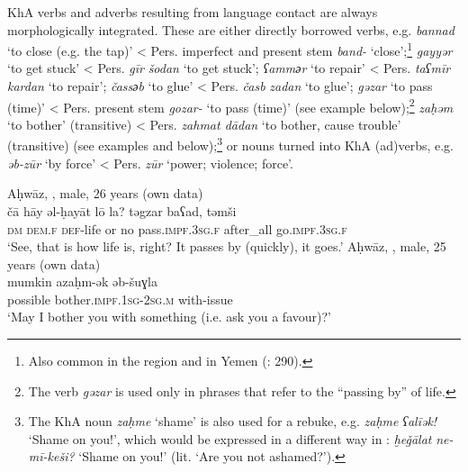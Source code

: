 \documentclass[output=paper,nonflat]{langsci/langscibook}
\begin{document}
KhA verbs and adverbs resulting from language contact are always morphologically integrated. These are either directly borrowed  verbs, e.g. \textit{bannad} ‘to close (e.g. the tap)’ < Pers. imperfect and present {stem} \textit{band-} ‘close’;\footnote{Also common in the  region and in {Yemen} (\citealt{BehnstedtWoidich2014}: 290).} \textit{gayyər} ‘to get stuck’ <  Pers. \textit{gīr} \textit{šodan} ‘to get stuck’; \textit{ʕamm{әr}} ‘to repair’ < Pers. \textit{taʕmīr} \textit{kardan} ‘to repair’; \textit{čass{әb}} ‘to glue’ < Pers. \textit{časb} \textit{zadan} ‘to glue’; \textit{gəzar} ‘to pass (time)’ < Pers. present {stem} \textit{gozar-} ‘to pass (time)’ (see example  below);\footnote{The verb \textit{gəzar} is used only in phrases that refer to the “passing by” of life.} \textit{zaḥəm} ‘to bother’ (transitive) < Pers. \textit{zahmat dādan} ‘to bother, cause trouble’ (transitive) (see examples  and  below);\footnote{The KhA noun \textit{zaḥme} `shame' is also used for a rebuke, e.g. \textit{zaḥme} \textit{ʕalīək!} ‘Shame on you!’, which would be expressed in a different way in : \textit{ḫeǧālat} \textit{ne-mī-keši?} ‘Shame on you!' (lit. ‘Are you not ashamed?’).} or  nouns turned into KhA (ad)verbs, e.g. \textit{əb-zūr} ‘by force’ < Pers. \textit{zūr} ‘power; violence; force’.

\ea
{Aḥwāz, , male, 26 years (own data)}\\ \label{ca}
\gll čā hāy əl-ḥayāt lō la? təgzar baʕad, təmši\\
     \textsc{dm} \textsc{dem}.\textsc{f} \textsc{def}{}-life or no pass.\textsc{impf}.\textsc{3sg.f} after\_all go.\textsc{impf.3sg.f}\\
\glt ‘See, that is how life is, right? It passes by (quickly), it goes.’
\z
{}
\ea \label{mumkin}
{Aḥwāz, , male, 25 years (own data)}\\
\gll mumkin azaḥm-ək əb-šuɣla\\
     possible bother.\textsc{impf}.\textsc{1sg}{}-\textsc{2sg.m} with-issue\\
\glt ‘May I bother you with something (i.e. ask you a favour)?’
\z
\end{document}
